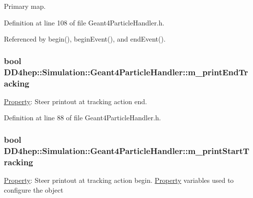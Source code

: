 Primary map. 

Definition at line 108 of file Geant4ParticleHandler.h.

Referenced by begin(), beginEvent(), and endEvent().\hypertarget{class_d_d4hep_1_1_simulation_1_1_geant4_particle_handler_a6d1f66487284fd0d7f61633c5fd891f1}{
\subsubsection[{m\_\-printEndTracking}]{\setlength{\rightskip}{0pt plus 5cm}bool {\bf DD4hep::Simulation::Geant4ParticleHandler::m\_\-printEndTracking}}}
\label{class_d_d4hep_1_1_simulation_1_1_geant4_particle_handler_a6d1f66487284fd0d7f61633c5fd891f1}


\hyperlink{class_d_d4hep_1_1_property}{Property}: Steer printout at tracking action end. 

Definition at line 88 of file Geant4ParticleHandler.h.\hypertarget{class_d_d4hep_1_1_simulation_1_1_geant4_particle_handler_a1960c5fe6223f3ec578196b79a5aa088}{
\subsubsection[{m\_\-printStartTracking}]{\setlength{\rightskip}{0pt plus 5cm}bool {\bf DD4hep::Simulation::Geant4ParticleHandler::m\_\-printStartTracking}}}
\label{class_d_d4hep_1_1_simulation_1_1_geant4_particle_handler_a1960c5fe6223f3ec578196b79a5aa088}


\hyperlink{class_d_d4hep_1_1_property}{Property}: Steer printout at tracking action begin. \hyperlink{class_d_d4hep_1_1_property}{Property} variables used to configure the object 


